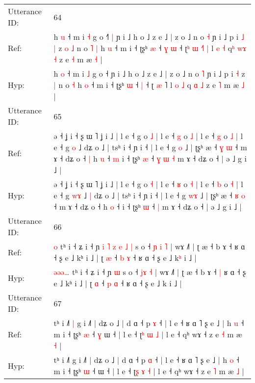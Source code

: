 \documentclass[10pt]{article}
\DeclareRobustCommand{\hl}[1]{{\textcolor{red}{#1}}}
\begin{document}
\begin{longtable}{ll}
 \\
\midrule
Utterance ID: & 64 \\
Ref: & h \hl{u} ˧ m i \hl{˧} g o ˧\hl{˥}\hl{ }\hl{|} ɲ i ˩ h o ˩ z e ˩ | z o ˩ n o \hl{˧} ɲ i ˩ p i\hl{ }\hl{˩} \hl{|} z\hl{ }\hl{o} \hl{˩} n o\hl{ }\hl{˥} \hl{|} h \hl{u} ˧ m i ˧ ʈʂʰ \hl{æ} ˧\hl{ }\hl{ɣ} \hl{ɯ} ˧ ʈ\hl{ʰ} \hl{ɯ} \hl{˧}˥\hl{ }\hl{|} l \hl{e} \hl{˧} q\hl{ʰ} \hl{w}\hl{ɤ} \hl{˧} z e \hl{˧} m æ \hl{˧} |
 \\
Hyp: & h \hl{o} ˧ m i \hl{˩} g o ˧\hl{}\hl{}\hl{} ɲ i ˩ h o ˩ z e ˩ | z o ˩ n o \hl{˥} ɲ i ˩ p i\hl{}\hl{} \hl{˧} z\hl{}\hl{} \hl{|} n o\hl{}\hl{} \hl{˧} h \hl{o} ˧ m i ˧ ʈʂʰ \hl{ɯ} ˧\hl{}\hl{} \hl{|} ˧ ʈ\hl{} \hl{æ} \hl{}˥\hl{}\hl{} l \hl{o} \hl{˩} q\hl{} \hl{}\hl{ɑ} \hl{˩} z e \hl{˥} m æ \hl{˩} |
 \\
\midrule
Utterance ID: & 65 \\
Ref: & ə ˧ ʝ i ˧ ʂ ɯ ˥ ʝ i ˩ | l e ˧ g o \hl{˩} | l e ˧ \hl{g} o \hl{˩} | l e ˧ \hl{g} o \hl{˩} | l e ˧ g \hl{}\hl{o} ˩\hl{}\hl{} dʑ o ˩ | tsʰ i ˧ ɲ i ˧ | l e ˧ g \hl{}\hl{o} ˩ | ʈʂʰ æ ˧ \hl{ɣ} \hl{ɯ} ˧ m ɤ ˧ dʑ o ˧\hl{ }\hl{|} h \hl{u} ˧\hl{ }\hl{m} i ˧ ʈʂʰ \hl{æ} ˧\hl{ }\hl{ɣ}\hl{ }\hl{ɯ} \hl{˧} m ɤ ˧ dʑ o ˧ | ə ˩ g i ˩ |
 \\
Hyp: & ə ˧ ʝ i ˧ ʂ ɯ ˥ ʝ i ˩ | l e ˧ g o \hl{˧} | l e ˧ \hl{ʁ} o \hl{˧} | l e ˧ \hl{b} o \hl{˧} | l e ˧ g \hl{w}\hl{ɤ} ˩\hl{ }\hl{|} dʑ o ˩ | tsʰ i ˧ ɲ i ˧ | l e ˧ g \hl{w}\hl{ɤ} ˩ | ʈʂʰ æ ˧ \hl{ʁ} \hl{o} ˧ m ɤ ˧ dʑ o ˧\hl{}\hl{} h \hl{o} ˧\hl{}\hl{} i ˧ ʈʂʰ \hl{ɯ} ˧\hl{}\hl{}\hl{}\hl{} \hl{|} m ɤ ˧ dʑ o ˧ | ə ˩ g i ˩ |
 \\
\midrule
Utterance ID: & 66 \\
Ref: & \hl{}\hl{}\hl{}\hl{o} tʰ i ˧ ʑ i ˧ ɲ\hl{ }\hl{i}\hl{ }\hl{˥}\hl{ }\hl{z}\hl{ }\hl{e}\hl{ }\hl{˩} \hl{|} s o ˧ \hl{ɲ}\hl{ }\hl{i} \hl{˥} | wɤ ˩˥ | ʈ æ ˧ b ɤ ˧\hl{}\hl{} ʁ ɑ ˧ ʂ e ˩ kʰ i ˩ | ʈ \hl{æ} ˧ \hl{b} \hl{ɤ} ˧ ʁ ɑ ˧ ʂ e ˩ k\hl{ʰ} i ˩ |
 \\
Hyp: & \hl{ə}\hl{ə}\hl{ə}\hl{…} tʰ i ˧ ʑ i ˧ ɲ\hl{}\hl{}\hl{}\hl{}\hl{}\hl{}\hl{}\hl{}\hl{}\hl{} \hl{ɯ} s o ˧ \hl{}\hl{j}\hl{ɤ} \hl{˧} | wɤ ˩˥ | ʈ æ ˧ b ɤ ˧\hl{ }\hl{|} ʁ ɑ ˧ ʂ e ˩ kʰ i ˩ | ʈ \hl{ɑ} ˧ \hl{p} \hl{ɑ} ˧ ʁ ɑ ˧ ʂ e ˩ k\hl{} i ˩ |
 \\
\midrule
Utterance ID: & 67 \\
Ref: & tʰ i ˩˥\hl{ }\hl{|} g i ˩˥ | dʑ o ˩ | d ɑ ˧ p \hl{ɤ} ˧ | l e ˧ ʁ ɑ ˥ ʂ e ˩ | h \hl{u} ˧ m i ˧ ʈʂʰ \hl{æ} ˧\hl{ }\hl{ɣ} ɯ ˧ | l e ˧ ʈ\hl{ʰ} \hl{ɯ} \hl{˩} | l e ˧ qʰ wɤ ˧ z e \hl{˧} m æ \hl{˧} |
 \\
Hyp: & tʰ i ˩˥\hl{}\hl{} g i ˩˥ | dʑ o ˩ | d ɑ ˧ p \hl{ɑ} ˧ | l e ˧ ʁ ɑ ˥ ʂ e ˩ | h \hl{o} ˧ m i ˧ ʈʂʰ \hl{ɯ} ˧\hl{}\hl{} ɯ ˧ | l e ˧ ʈ\hl{ʂ} \hl{ɤ} \hl{˧} | l e ˧ qʰ wɤ ˧ z e \hl{˥} m æ \hl{˩} |

\end{longtable}
\end{document}
